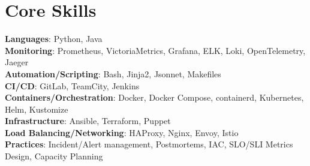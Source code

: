 \documentclass[letterpaper,11pt]{article}
\begin{document}
\section{Core Skills}
 \begin{itemize}[leftmargin=0.15in, label={}]
    \small{\item{
     \textbf{Languages}{: Python, Java} \\
     \textbf{Monitoring}{: Prometheus, VictoriaMetrics, Grafana, ELK, Loki, OpenTelemetry, Jaeger} \\
     \textbf{Automation/Scripting}{: Bash, Jinja2, Jsonnet, Makefiles} \\
     \textbf{CI/CD}{: GitLab, TeamCity, Jenkins} \\
     \textbf{Containers/Orchestration}{: Docker, Docker Compose, containerd, Kubernetes, Helm, Kustomize} \\
     \textbf{Infrastructure}{: Ansible, Terraform, Puppet} \\
     \textbf{Load Balancing/Networking}{: HAProxy, Nginx, Envoy, Istio} \\
     \textbf{Practices}{: Incident/Alert management, Postmortems, IAC, SLO/SLI Metrics Design, Capacity Planning} \\
    }}
 \end{itemize}


\end{document}
